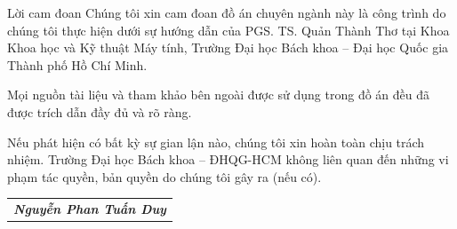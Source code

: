 \begin{preface}{Lời cam đoan}
  Chúng tôi xin cam đoan đồ án chuyên ngành này là công trình do chúng tôi thực hiện dưới sự hướng dẫn của PGS. TS. Quản Thành Thơ tại Khoa Khoa học và Kỹ thuật Máy tính, Trường Đại học Bách khoa -- Đại học Quốc gia Thành phố Hồ Chí Minh.

  \noindent Mọi nguồn tài liệu và tham khảo bên ngoài được sử dụng trong đồ án đều đã được trích dẫn đầy đủ và rõ ràng.

  \noindent Nếu phát hiện có bất kỳ sự gian lận nào, chúng tôi xin hoàn toàn chịu trách nhiệm. Trường Đại học Bách khoa -- ĐHQG-HCM không liên quan đến những vi phạm tác quyền, bản quyền do chúng tôi gây ra (nếu có).

  \vspace{2cm}

  \begin{flushright}
    \begin{tabular}{c}
      \textit{\textbf{Nguyễn Phan Tuấn Duy}} \\
    \end{tabular}
  \end{flushright}
\end{preface}
